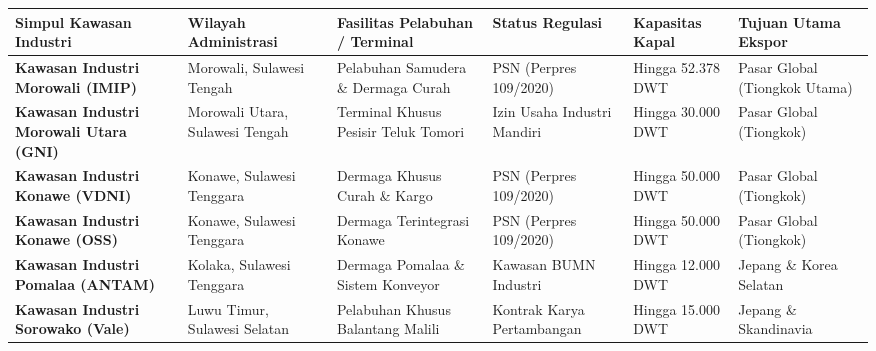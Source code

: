 \documentclass[
]{article}
\newcounter{none} %
\begin{document}
{\def\LTcaptype{none} %
\begin{longtable}[]{@{}
  >{\raggedright\arraybackslash}p{}
  >{\raggedright\arraybackslash}p{}
  >{\raggedright\arraybackslash}p{}
  >{\centering\arraybackslash}p{}
  >{\centering\arraybackslash}p{}
  >{\raggedright\arraybackslash}p{}@{}}
\toprule\noalign{}
\begin{minipage}[b]{\linewidth}\raggedright
Simpul Kawasan Industri
\end{minipage} & \begin{minipage}[b]{\linewidth}\raggedright
Wilayah Administrasi
\end{minipage} & \begin{minipage}[b]{\linewidth}\raggedright
Fasilitas Pelabuhan / Terminal
\end{minipage} & \begin{minipage}[b]{\linewidth}\centering
Status Regulasi
\end{minipage} & \begin{minipage}[b]{\linewidth}\centering
Kapasitas Kapal
\end{minipage} & \begin{minipage}[b]{\linewidth}\raggedright
Tujuan Utama Ekspor
\end{minipage} \\
\midrule\noalign{}
\endhead
\bottomrule\noalign{}
\endlastfoot
\textbf{Kawasan Industri Morowali (IMIP)} & Morowali, Sulawesi Tengah &
Pelabuhan Samudera \& Dermaga Curah & PSN (Perpres 109/2020) & Hingga
52.378 DWT & Pasar Global (Tiongkok Utama) \\
\textbf{Kawasan Industri Morowali Utara (GNI)} & Morowali Utara,
Sulawesi Tengah & Terminal Khusus Pesisir Teluk Tomori & Izin Usaha
Industri Mandiri & Hingga 30.000 DWT & Pasar Global (Tiongkok) \\
\textbf{Kawasan Industri Konawe (VDNI)} & Konawe, Sulawesi Tenggara &
Dermaga Khusus Curah \& Kargo & PSN (Perpres 109/2020) & Hingga 50.000
DWT & Pasar Global (Tiongkok) \\
\textbf{Kawasan Industri Konawe (OSS)} & Konawe, Sulawesi Tenggara &
Dermaga Terintegrasi Konawe & PSN (Perpres 109/2020) & Hingga 50.000 DWT
& Pasar Global (Tiongkok) \\
\textbf{Kawasan Industri Pomalaa (ANTAM)} & Kolaka, Sulawesi Tenggara &
Dermaga Pomalaa \& Sistem Konveyor & Kawasan BUMN Industri & Hingga
12.000 DWT & Jepang \& Korea Selatan \\
\textbf{Kawasan Industri Sorowako (Vale)} & Luwu Timur, Sulawesi Selatan
& Pelabuhan Khusus Balantang Malili & Kontrak Karya Pertambangan &
Hingga 15.000 DWT & Jepang \& Skandinavia \\
\end{longtable}
}
\end{document}
